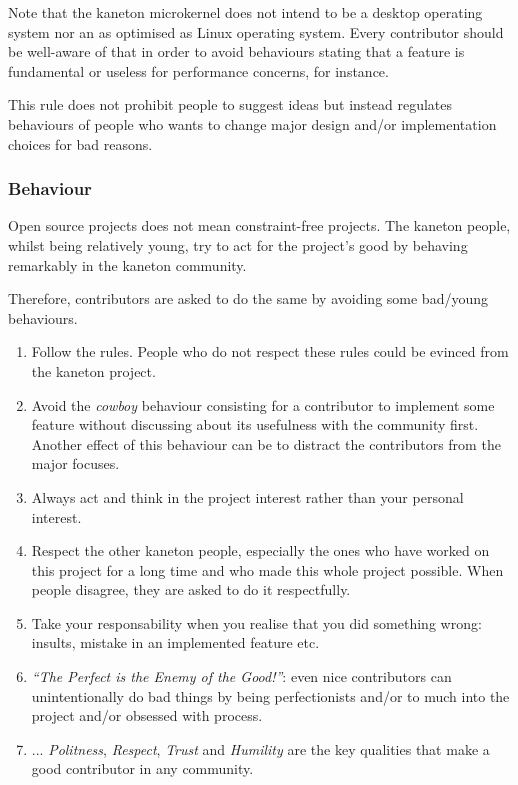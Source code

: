 Note that the kaneton microkernel does not intend to be a desktop operating
system nor an as optimised as Linux operating system. Every contributor should
be well-aware of that in order to avoid behaviours stating that a feature
is fundamental or useless for performance concerns, for instance.

This rule does not prohibit people to suggest ideas but instead regulates
behaviours of people who wants to change major design and/or implementation
choices for bad reasons.


\subsubsection{Behaviour}

Open source projects does not mean constraint-free projects. The kaneton
people, whilst being relatively young, try to act for the project's good
by behaving remarkably in the kaneton community.

Therefore, contributors are asked to do the same by avoiding some bad/young
behaviours.

\begin{enumerate}
  \item
    Follow the rules. People who do not respect these rules could be evinced
    from the kaneton project.
  \item
    Avoid the \textit{cowboy} behaviour consisting for a contributor to
    implement some feature without discussing about its usefulness with the
    community first. Another effect of this behaviour can be to distract
    the contributors from the major focuses.
  \item
    Always act and think in the project interest rather than your personal
    interest.
  \item
    Respect the other kaneton people, especially the ones who have worked
    on this project for a long time and who made this whole project possible.
    When people disagree, they are asked to do it respectfully.
  \item
    Take your responsability when you realise that you did something wrong:
    insults, mistake in an implemented feature etc.
  \item
    \textit{``The Perfect is the Enemy of the Good!''}: even nice
    contributors can unintentionally do bad things by being perfectionists
    and/or to much into the project and/or obsessed with process.
  \item
    ... \textit{Politness}, \textit{Respect}, \textit{Trust} and
    \textit{Humility} are the key qualities that make a good contributor in
    any community.
\end{enumerate}

